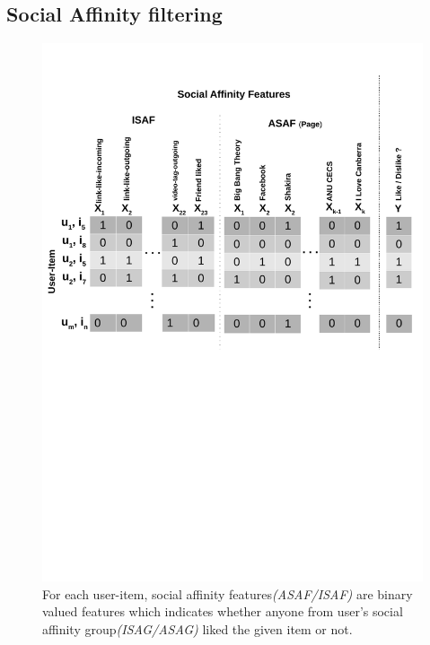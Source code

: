 
\subsection{Social Affinity filtering}

\begin{figure}[t!]
\centering
\includegraphics[width=1\linewidth]{data/plots/features/saf_features}
\caption{For each user-item, social affinity features\textit{(ASAF/ISAF)} are binary valued features which indicates
whether anyone from user's social affinity group\textit{(ISAG/ASAG)} liked the given item or not.}
\label{fig:features_overview}
\end{figure}

